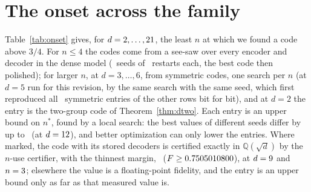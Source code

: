 \documentclass[aps,pra,twocolumn,superscriptaddress,nofootinbib,longbibliography,floatfix]{revtex4-2}
\begin{document}
\section{The onset across the family}
\label{sec:onset}

Table~\ref{tab:onset} gives, for $d=2,\dots,21$, the least $n$ at which we found a code above $3/4$. For $n\le4$ the codes come from a see-saw over every encoder and decoder in the dense model (\SearchSeeds\ seeds of \SearchRestarts\ restarts each, the best code then polished); for larger $n$, at $d=3,\dots,6$, from symmetric codes, one search per $n$ (at $d=5$ run for this revision, by the same search with the same seed, which first reproduced all \SymReproCount\ symmetric entries of the other rows bit for bit), and at $d=2$ the entry is the two-group code of Theorem~\ref{thm:dtwo}. Each entry is an upper bound on $n^*$, found by a local search: the best values of different seeds differ by up to \SeedSpreadMax\ (at $d=12$), and better optimization can only lower the entries. Where marked, the code with its stored decoders is certified exactly in $\mathbb Q(\sqrt d)$ by the $n$-use certifier, with the thinnest margin, \NineMargin\ ($F\ge0.7505010800$), at $d=9$ and $n=3$; elsewhere the value is a floating-point fidelity, and the entry is an upper bound only as far as that measured value is.

\begin{table}[tbp]
\caption{The onset across the family, $p=1/(\sqrt d+1)$. \emph{$n^*\le$}: the least $n$ at which a code was found above $3/4$; \emph{$F$ at $n$}: that code's fidelity, certified lower bound (truncated) or floating-point value; \emph{best at $n-1$}: the best floating-point value our search found with one use fewer, which bounds nothing about other codes. At $d=2$ the entry is the two-group code of Theorem~\ref{thm:dtwo}; symmetric codes first cross at $\PubN$. $^\dagger$This code is also certified, $F\ge\DarkF$: a bound just below its floating-point value, which is itself below $3/4$ (Sec.~\ref{sec:onset}). $^\ddagger$Lemma~\ref{lem:oneuse}.}
\label{tab:onset}
\small\setlength{\tabcolsep}{3pt}

\end{table}
\end{document}
